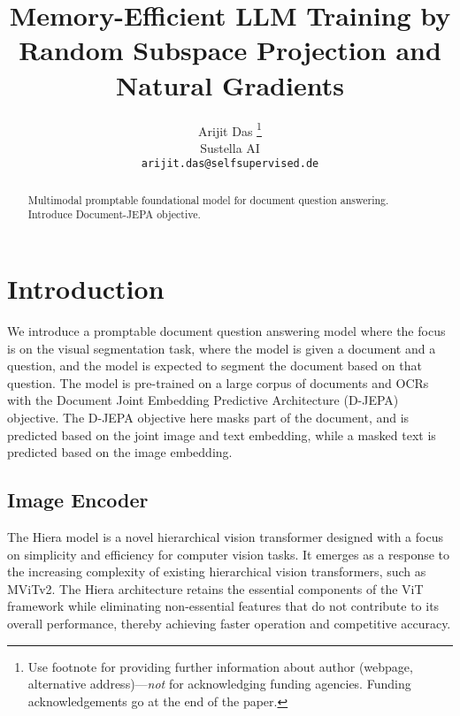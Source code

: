 \documentclass{article} %
\title{Memory-Efficient LLM Training by Random Subspace Projection and Natural Gradients}
\author{Arijit Das \thanks{ Use footnote for providing further information
about author (webpage, alternative address)---\emph{not} for acknowledging
funding agencies.  Funding acknowledgements go at the end of the paper.} \\
Sustella AI\\
\texttt{arijit.das@selfsupervised.de}
}
\begin{document}
\maketitle

\begin{abstract}
Multimodal promptable foundational model for document question answering. Introduce Document-JEPA objective. 
\end{abstract}

\section{Introduction}

We introduce a promptable document question answering model where the focus is on the visual segmentation task, where the model is given a document and a question, and the model is expected to segment the document based on that question. The model is pre-trained on a large corpus of documents and OCRs with the Document Joint Embedding Predictive Architecture (D-JEPA) objective. The D-JEPA objective here masks part of the document, and is predicted based on the joint image and text embedding, while a masked text is predicted based on the image embedding.


\subsection{Image Encoder}
The Hiera model is a novel hierarchical vision transformer designed with a focus on simplicity and efficiency for computer vision tasks. It emerges as a response to the increasing complexity of existing hierarchical vision transformers, such as MViTv2. The Hiera architecture retains the essential components of the ViT framework while eliminating non-essential features that do not contribute to its overall performance, thereby achieving faster operation and competitive accuracy.
\end{document}
